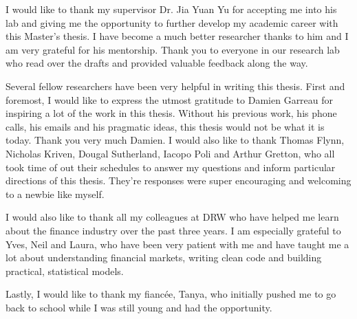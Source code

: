 \begin{acknowledgments}
  
I would like to thank my supervisor Dr. Jia Yuan Yu for accepting me into his lab and giving me the opportunity to further develop my academic career with this Master's thesis. I have become a much better researcher thanks to him and I am very grateful for his mentorship. Thank you to everyone in our research lab who read over the drafts and provided valuable feedback along the way.
  
Several fellow researchers have been very helpful in writing this thesis. First and foremost, I would like to express the utmost gratitude to Damien Garreau for inspiring a lot of the work in this thesis. Without his previous work, his phone calls, his emails and his pragmatic ideas, this thesis would not be what it is today. Thank you very much Damien. I would also like to thank Thomas Flynn, Nicholas Kriven, Dougal Sutherland, Iacopo Poli and Arthur Gretton, who all took time of out their schedules to answer my questions and inform particular directions of this thesis. They're responses were super encouraging and welcoming to a newbie like myself.
  
I would also like to thank all my colleagues at DRW who have helped me learn about the finance industry over the past three years. I am especially grateful to Yves, Neil and Laura, who have been very patient with me and have taught me a lot about understanding financial markets, writing clean code and building practical, statistical models.
  
Lastly, I would like to thank my fiancée, Tanya, who initially pushed me to go back to school while I was still young and had the opportunity. 
\end{acknowledgments}
